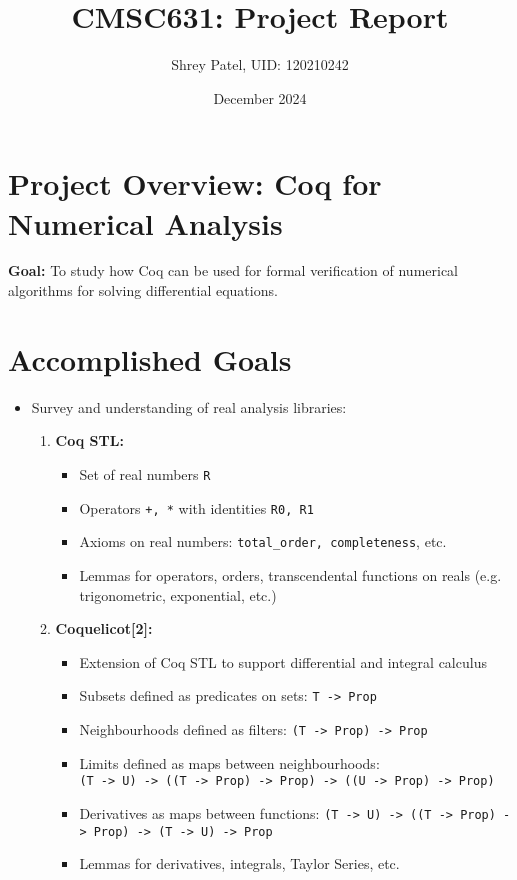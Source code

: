 \documentclass{article}
\title{CMSC631: Project Report}
\author{Shrey Patel, UID: 120210242}
\date{December 2024}
\begin{document}
\maketitle

\section*{Project Overview: Coq for Numerical Analysis}
\textbf{Goal:} To study how Coq can be used for formal verification of numerical algorithms for solving differential equations.

\section*{Accomplished Goals}
\begin{itemize}
    \item Survey and understanding of real analysis libraries: 
    \begin{enumerate}
        \item \textbf{Coq STL:} 
        \begin{itemize}
            \item Set of real numbers \texttt{R}
            \item Operators \texttt{+, *} with identities \texttt{R0, R1}
            \item Axioms on real numbers: \texttt{total\_order, completeness}, etc.
            \item Lemmas for operators, orders, transcendental functions on reals (e.g. trigonometric, exponential, etc.)
        \end{itemize}
        \item \textbf{Coquelicot[2]:}
        \begin{itemize}
            \item Extension of Coq STL to support differential and integral calculus
            \item Subsets defined as predicates on sets: \texttt{T -> Prop}
            \item Neighbourhoods defined as filters: \texttt{(T -> Prop) -> Prop}
            \item Limits defined as maps between neighbourhoods: \\\texttt{(T -> U) -> ((T -> Prop) -> Prop) -> ((U -> Prop) -> Prop)}
            \item Derivatives as maps between functions: \texttt{(T -> U) -> ((T -> Prop) -> Prop) -> (T -> U) -> Prop}
            \item Lemmas for derivatives, integrals, Taylor Series, etc. 

\end{itemize}
\end{enumerate}
\end{itemize}
\end{document}
